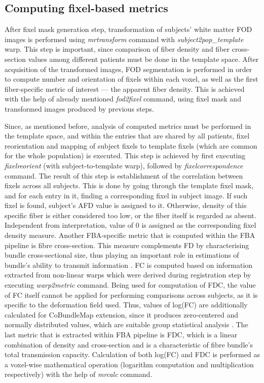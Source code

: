 \documentclass[thesis.tex]{subfiles}
\begin{document}
\subsection{Computing fixel-based metrics}
After fixel mask generation step, transformation of subjects' white matter FOD images is performed using \textit{mrtransform} command with \textit{subject2pop\_template} warp. This step is important, since comparison of fiber density and fiber cross-section values among different patients must be done in the template space. After acquisition of the transformed images, FOD segmentation is performed in order to compute number and orientation of fixels within each voxel, as well as the first fiber-specific metric of interest --- the apparent fiber density. This is achieved with the help of already mentioned \textit{fod2fixel} command, using fixel mask and transformed images produced by previous steps. 

Since, as mentioned before, analysis of computed metrics must be performed in the template space, and within the entries that are shared by all patients, fixel reorientation and mapping of subject fixels to template fixels (which are common for the whole population) is executed. This step is achieved by first executing \textit{fixelreorient} (with subject-to-template warp), followed by \textit{fixelcorrespondence} command. The result of this step is establishment of the correlation between fixels across all subjects. This is done by going through the template fixel mask, and for each entry in it, finding a corresponding fixel in subject image. If such fixel is found, subject's AFD value is assigned to it. Otherwise, density of this specific fiber is either considered too low, or the fiber itself is regarded as absent. Independent from interpretation, value of 0 is assigned as the corresponding fixel density measure. Another FBA-specific metric that is computed within the FBA pipeline is fibre cross-section. This measure complements FD by characterising bundle cross-sectional size, thus playing an important role in estimations of bundle's ability to transmit information \cite{fdcAndFBA2017Raffelt}. FC is computed based on information extracted from non-linear warps which were derived during registration step by executing \textit{warp2metric} command. Being used for computation of FDC, the value of FC itself cannot be applied for performing comparisons across subjects, as it is specific to the deformation field used. Thus, values of log(FC) are additionally calculated for CoBundleMap extension, since it produces zero-centered and normally distributed values, which are suitable group statistical analysis \cite{mrtrixDocu}. The last metric that is extracted within FBA pipeline is FDC, which is a linear combination of density and cross-section and is a characteristic of fibre bundle's total transmission capacity. Calculation of both log(FC) and FDC is performed as a voxel-wise mathematical operation (logarithm computation and multiplication respectively) with the help of \textit{mrcalc} command.
\end{document}
